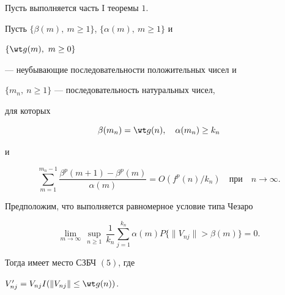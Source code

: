 \begin{thm}


Пусть выполняется часть $\mathrm I$ теоремы $1$.


Пусть $\{\beta(m),\ m\geq 1\}$, $\{\alpha(m),\ m\geq 1\}$ и


$\{\wt g(m),\ m\geq0\}$


--- неубывающие последовательности положительных чисел и


$\{m_n,\ n\geq 1\}$ --- последовательность натуральных чисел,


для которых


\begin{equation}


\beta(m_n)= \wt g(n), \quad


\alpha(m_n)\ge k_n


\end{equation}


и


\begin{equation}


\sum_{m=1}^{m_n-1} \frac{\beta^{p}(m+1) - \beta^{p}(m)}{\alpha(m)}=


O(f^{p}(n)/k_n)\quad \text{при}\quad n\to\infty.


\end{equation}


Предположим, что выполняется равномерное условие типа Чезаро


\begin{equation}


\lim_{m \rightarrow \infty}\, \sup_{n \geq 1}\, \frac{1}{k_n}


\sum^{k_n}_{j=1} \alpha(m) P\{\|V_{nj}\|> \beta(m)\} = 0.


\end{equation}


Тогда имеет место СЗБЧ $(5)$, где


$V'_{nj} = V_{nj}I(\|V_{nj}\|\leq \wt g(n))$.


\end{thm}





